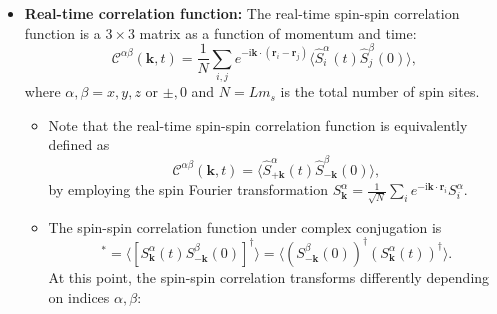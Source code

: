 \documentclass[aps, prx, nofootinbib, superscriptaddress]{revtex4-2}
\newcommand{\kvec}{\mathbf{k}}
\newcommand{\ri}{\mathrm{i}}
\begin{document}
\begin{itemize}
    \item \textbf{Real-time correlation function:}
    The real-time spin-spin correlation function is a $3 \times 3$ matrix as a function of momentum and time:
    \begin{equation}
        \mathcal{C}^{\alpha\beta} (\kvec, t) = \frac{1}{N} \sum_{i, j} e^{- \ri \kvec \cdot (\mathbf{r}_{i} - \mathbf{r}_{j})} \langle \hat{S}_{i}^{\alpha}(t) \hat{S}_{j}^{\beta}(0) \rangle,
    \end{equation}
    where $\alpha, \beta = x, y, z$ or $\pm, 0$ and $N = L m_s$ is the total number of spin sites. 

    \begin{itemize}
        \item Note that the real-time spin-spin correlation function is equivalently defined as 
        \begin{equation}
            \mathcal{C}^{\alpha\beta} (\kvec, t) 
            = \big\langle \hat{S}_{+ \kvec}^{\alpha}(t) \hat{S}_{- \kvec}^{\beta}(0) \big\rangle,  
        \end{equation}
        by employing the spin Fourier transformation $S_{\kvec}^{\alpha} = \frac{1}{\sqrt{N}} \sum_{i} e^{-\ri \kvec \cdot \mathbf{r}_{i}} S_{i}^{\alpha}$.
        
        \item The spin-spin correlation function under complex conjugation is 
        \begin{equation}
            [\mathcal{C}^{\alpha\beta}(\kvec, t)]^{*}
            = \langle [S_{\kvec}^{\alpha} ( t ) S_{-\kvec}^{\beta} ( 0 )]^{\dagger} \rangle
            = \langle (S_{-\kvec}^{\beta} ( 0 ))^{\dagger} (S_{\kvec}^{\alpha} ( t ))^{\dagger} \rangle.
        \end{equation}
        At this point, the spin-spin correlation transforms differently depending on indices $\alpha, \beta$:
        

\end{itemize}
\end{itemize}
\end{document}
